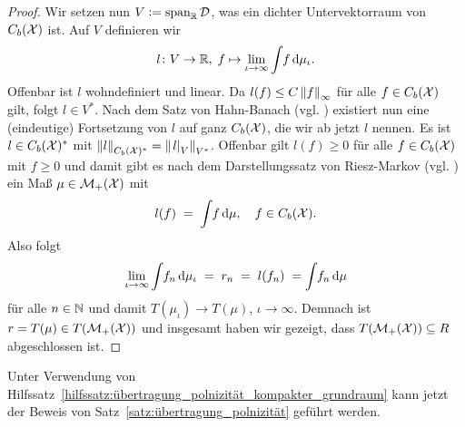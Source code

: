 \documentclass[../thesis/thesis.tex]{subfiles}
\begin{document}
\begin{proof}
		Wir setzen nun $V \vcentcolon = \mathrm{span}_{\mathbb{R}} \, \mathcal{D}$, was ein dichter Untervektorraum von $C_b(\mathcal{X})$ ist. Auf $V$ definieren wir
		\[ l \colon V \to \mathbb{R}, \; f \mapsto \lim_{\iota \to \infty} \int_{} \, f \, \mathrm{d}\mu_\iota  \text{.} \]
		Offenbar ist $l$ wohndefiniert und linear. Da $l(f) \leq C \left\lVert f\right\rVert_\infty$ für alle $f \in C_b(\mathcal{X})$ gilt, folgt $l \in V^\ast$. Nach dem Satz von Hahn-Banach (vgl. \cite[Corollary 5.5.2]{Simon.2015})
		existiert nun eine (eindeutige) Fortsetzung von $l$ auf ganz $C_b(\mathcal{X})$, die wir ab jetzt $l$ nennen. Es ist $l \in C_b(\mathcal{X})^\ast$ 
		mit $\left\lVert l\right\rVert_{C_b(\mathcal{X})^\ast} = \left\lVert\left.l\right|_{V}\right\rVert_{V^\ast}$. Offenbar gilt $l(f) \geq 0$ für alle $f \in C_b(\mathcal{X})$ mit $f \geq 0$ und damit gibt es 
		nach dem Darstellungssatz von Riesz-Markov (vgl. \cite[Theorem 4.8.8]{Simon.2015}) ein Maß $\mu \in \mathcal{M}_{+}(\mathcal{X})$ mit 
		\[ l(f) \; = \; \int_{} \, f \, \mathrm{d}\mu, \quad f \in C_b(\mathcal{X}) \text{.} \]
		Also folgt
		\[ \lim_{\iota \to \infty} \int_{} \, f_n \, \mathrm{d}\mu_\iota \; = \; r_n \; = \; l(f_n) \; = \int_{} \, f_n \, \mathrm{d}\mu \]
		für alle $n \in \mathbb{N}$ und damit $T(\mu_\iota) \to T(\mu)$, $\iota \to \infty$. Demnach ist $r = T(\mu) \in T(\mathcal{M}_{+}(\mathcal{X}))$ und insgesamt haben wir gezeigt, dass $T(\mathcal{M}_{+}(\mathcal{X})) \subseteq R$ abgeschlossen ist.
	\end{proof}

	Unter Verwendung von Hilfssatz~\ref{hilfssatz:übertragung_polnizität_kompakter_grundraum} kann jetzt der Beweis von Satz~\ref{satz:übertragung_polnizität} geführt werden.
\end{document}
